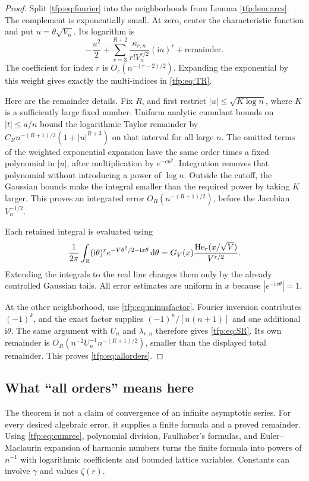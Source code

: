 \documentclass[11pt,a4paper]{article}
\numberwithin{equation}{section}
\theoremstyle{definition}\newtheorem{definition}[theorem]{Definition}
\theoremstyle{remark}\newtheorem{remark}[theorem]{Remark}
\newcommand{\He}{\operatorname{He}}
\newcommand{\ii}{\mathrm i}
\newcommand{\dd}{\mathrm d}
\begin{document}
\begin{proof}
Split \eqref{tfp:eq:fourier} into the neighborhoods from
Lemma \ref{tfp:lem:arcs}. The complement is exponentially small. At zero,
center the characteristic function and put $u=\theta\sqrt{V_n}$.
Its logarithm is
\begin{equation}\label{tfp:eq:localexp}
 -\frac{u^2}{2}
       +\sum_{r=3}^{R+2}\frac{\kappa_{r,n}}{r!V_n^{r/2}}(\ii u)^r
       +\text{remainder}.
\end{equation}
The coefficient for index $r$ is $O_r(n^{-(r-2)/2})$. Expanding the
exponential by this weight gives exactly the multi-indices in
\eqref{tfp:eq:TR}.

Here are the remainder details. Fix $R$, and first restrict
$|u|\le\sqrt{K\log n}$, where $K$ is a sufficiently large fixed number.
Uniform analytic cumulant bounds on $|t|\le a/n$ bound the logarithmic
Taylor remainder by
$C_R n^{-(R+1)/2}(1+|u|^{R+3})$ on that interval for all large $n$.
The omitted terms of the weighted exponential expansion have the same
order times a fixed polynomial in $|u|$, after multiplication by
$e^{-c u^2}$. Integration removes that polynomial without introducing
a power of $\log n$. Outside the cutoff, the Gaussian bounds make the
integral smaller than the required power by taking $K$ larger. This
proves an integrated error $O_R(n^{-(R+1)/2})$, before the Jacobian
$V_n^{-1/2}$.

Each retained integral is evaluated using
\begin{equation}\label{tfp:eq:hermiteintegral}
 \frac1{2\pi}\int_{\R}(\ii\theta)^r
       e^{-V\theta^2/2-\ii x\theta}\,\dd\theta
       =G_V(x)\frac{\He_r(x/\sqrt V)}{V^{r/2}}.
\end{equation}
Extending the integrals to the real line changes them only by the
already controlled Gaussian tails. All error estimates are uniform in
$x$ because $|e^{-\ii x\theta}|=1$.

At the other neighborhood, use \eqref{tfp:eq:minusfactor}. Fourier inversion
contributes $(-1)^k$, and the exact factor supplies $(-1)^n/[n(n+1)]$
and one additional $\ii\theta$. The same argument with $U_n$ and
$\lambda_{r,n}$ therefore gives \eqref{tfp:eq:SR}. Its own remainder is
$O_R(n^{-2}U_n^{-1}n^{-(R+1)/2})$, smaller than the displayed total
remainder. This proves \eqref{tfp:eq:allorders}.
\end{proof}

\subsection{What ``all orders'' means here}
The theorem is not a claim of convergence of an infinite asymptotic
series. For every desired algebraic error, it supplies a finite formula
and a proved remainder. Using \eqref{tfp:eq:cumrec}, polynomial division,
Faulhaber's formulas, and Euler--Maclaurin expansion of harmonic numbers
turns the finite formula into powers of $n^{-1}$ with logarithmic
coefficients and bounded lattice variables. Constants can involve
$\gamma$ and values $\zeta(r)$.
\end{document}
